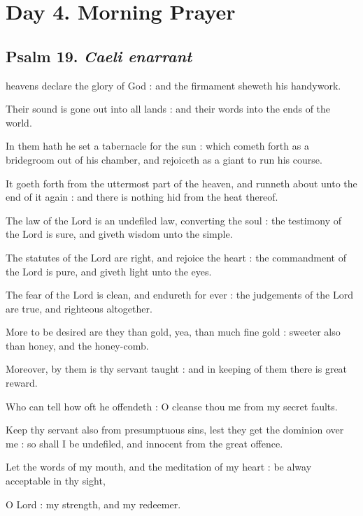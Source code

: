 \section*{Day 4. Morning Prayer}

\subsection{Psalm 19. \textit{Caeli enarrant}}

 heavens declare the glory of God : and the firmament sheweth his handywork.\par
{}
Their sound is gone out into all lands : and their words into the ends of the world.\par
{}In them hath he set a tabernacle for the sun : which cometh forth as a bridegroom out of his chamber, and rejoiceth as a giant to run his course.\par
{}It goeth forth from the uttermost part of the heaven, and runneth about unto the end of it again : and there is nothing hid from the heat thereof.\par
{}The law of the Lord is an undefiled law, converting the soul : the testimony of the Lord is sure, and giveth wisdom unto the simple.\par
{}The statutes of the Lord are right, and rejoice the heart : the commandment of the Lord is pure, and giveth light unto the eyes.\par
{}The fear of the Lord is clean, and endureth for ever : the judgements of the Lord are true, and righteous altogether.\par
{}More to be desired are they than gold, yea, than much fine gold : sweeter also than honey, and the honey-comb.\par
{}Moreover, by them is thy servant taught : and in keeping of them there is great reward.\par
{}Who can tell how oft he offendeth : O cleanse thou me from my secret faults.\par
{}Keep thy servant also from presumptuous sins, lest they get the dominion over me : so shall I be undefiled, and innocent from the great offence.\par
{}Let the words of my mouth, and the meditation of my heart : be alway acceptable in thy sight,\par
{}O Lord : my strength, and my redeemer.\par

